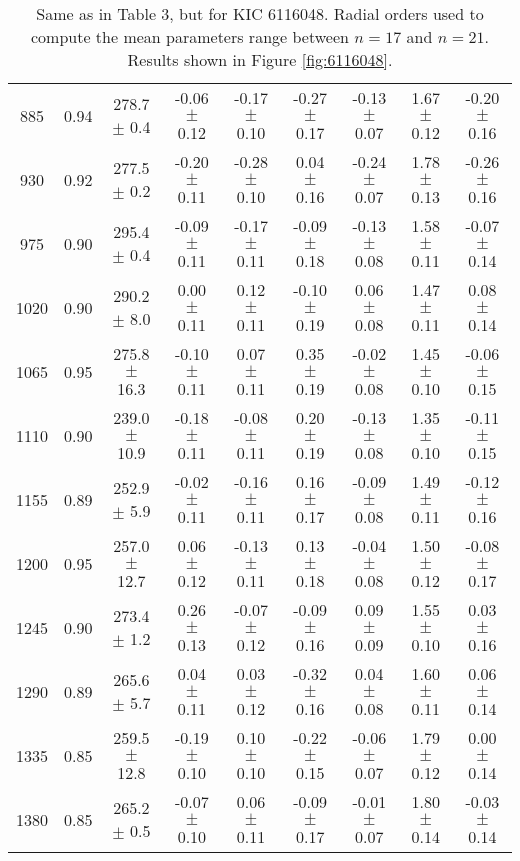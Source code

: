 \documentclass[twocolumn]{aastex61}%
\begin{document}
\begin{table*}[ht]
\begin{tabular}{ccc|ccccc|c}
885 & 0.94 & 278.7 $\pm$ 0.4 & -0.06 $\pm$ 0.12 & -0.17 $\pm$ 0.10 & -0.27 $\pm$ 0.17 & -0.13 $\pm$ 0.07 & 1.67 $\pm$ 0.12 & -0.20 $\pm$ 0.16\\
930 & 0.92 & 277.5 $\pm$ 0.2 & -0.20 $\pm$ 0.11 & -0.28 $\pm$ 0.10 & 0.04 $\pm$ 0.16 & -0.24 $\pm$ 0.07 & 1.78 $\pm$ 0.13 & -0.26 $\pm$ 0.16\\
975 & 0.90 & 295.4 $\pm$ 0.4 & -0.09 $\pm$ 0.11 & -0.17 $\pm$ 0.11 & -0.09 $\pm$ 0.18 & -0.13 $\pm$ 0.08 & 1.58 $\pm$ 0.11 & -0.07 $\pm$ 0.14\\
1020 & 0.90 & 290.2 $\pm$ 8.0 & 0.00 $\pm$ 0.11 & 0.12 $\pm$ 0.11 & -0.10 $\pm$ 0.19 & 0.06 $\pm$ 0.08 & 1.47 $\pm$ 0.11 & 0.08 $\pm$ 0.14\\
1065 & 0.95 & 275.8 $\pm$ 16.3 & -0.10 $\pm$ 0.11 & 0.07 $\pm$ 0.11 & 0.35 $\pm$ 0.19 & -0.02 $\pm$ 0.08 & 1.45 $\pm$ 0.10 & -0.06 $\pm$ 0.15\\
1110 & 0.90 & 239.0 $\pm$ 10.9 & -0.18 $\pm$ 0.11 & -0.08 $\pm$ 0.11 & 0.20 $\pm$ 0.19 & -0.13 $\pm$ 0.08 & 1.35 $\pm$ 0.10 & -0.11 $\pm$ 0.15\\
1155 & 0.89 & 252.9 $\pm$ 5.9 & -0.02 $\pm$ 0.11 & -0.16 $\pm$ 0.11 & 0.16 $\pm$ 0.17 & -0.09 $\pm$ 0.08 & 1.49 $\pm$ 0.11 & -0.12 $\pm$ 0.16\\
1200 & 0.95 & 257.0 $\pm$ 12.7 & 0.06 $\pm$ 0.12 & -0.13 $\pm$ 0.11 & 0.13 $\pm$ 0.18 & -0.04 $\pm$ 0.08 & 1.50 $\pm$ 0.12 & -0.08 $\pm$ 0.17\\
1245 & 0.90 & 273.4 $\pm$ 1.2 & 0.26 $\pm$ 0.13 & -0.07 $\pm$ 0.12 & -0.09 $\pm$ 0.16 & 0.09 $\pm$ 0.09 & 1.55 $\pm$ 0.10 & 0.03 $\pm$ 0.16\\
1290 & 0.89 & 265.6 $\pm$ 5.7 & 0.04 $\pm$ 0.11 & 0.03 $\pm$ 0.12 & -0.32 $\pm$ 0.16 & 0.04 $\pm$ 0.08 & 1.60 $\pm$ 0.11 & 0.06 $\pm$ 0.14\\
1335 & 0.85 & 259.5 $\pm$ 12.8 & -0.19 $\pm$ 0.10 & 0.10 $\pm$ 0.10 & -0.22 $\pm$ 0.15 & -0.06 $\pm$ 0.07 & 1.79 $\pm$ 0.12 & 0.00 $\pm$ 0.14\\
1380 & 0.85 & 265.2 $\pm$ 0.5 & -0.07 $\pm$ 0.10 & 0.06 $\pm$ 0.11 & -0.09 $\pm$ 0.17 & -0.01 $\pm$ 0.07 & 1.80 $\pm$ 0.14 & -0.03 $\pm$ 0.14\\
\end{tabular}
\caption{Same as in Table 3, but for KIC 6116048. Radial orders used to compute the mean parameters range between $n=17$ and $n=21$. Results shown in Figure \ref{fig:6116048}.}\label{tab:6116048}
\end{table*}
\end{document}
